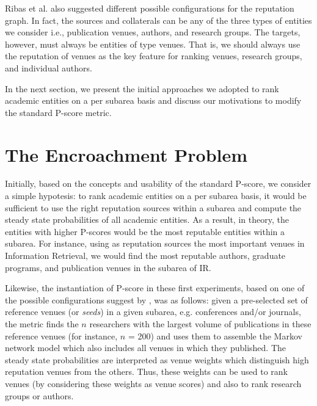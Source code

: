 \documentclass[msc]{ppgccufmg}
\begin{document}
Ribas et al. also suggested different possible configurations for the reputation graph. In fact, the sources and collaterals can be any of the three types of entities we consider i.e., publication venues, authors, and research groups. The targets, however, must always be entities of type venues. That is, we should always use the reputation of venues as the key feature for ranking venues, research groups, and individual authors. 

In the next section, we present the initial approaches we adopted to rank academic entities on a per subarea basis and discuss our motivations to modify the standard P-score metric.


\section{The Encroachment Problem}\label{sec:encroachment}

Initially, based on the concepts and usability of the standard P-score, we consider a simple hypotesis: to rank academic entities on a per subarea basis, it would be sufficient to use the right reputation sources within a subarea and compute the steady state probabilities of all academic entities. As a result, in theory, the entities with higher P-scores would be the most reputable entities within a subarea. For instance, using as reputation sources the most important venues in Information Retrieval, we would find the most reputable authors, graduate programs, and publication venues in the subarea of IR.

Likewise, the instantiation of P-score in these first experiments, based on one of the possible configurations suggest by \citeauthor{ribas2015random}, was as follows: given a pre-selected set of reference venues (or \textit{seeds}) in a given subarea, e.g. conferences and/or journals, the metric finds the $n$ researchers with the largest volume of publications in these reference venues (for instance, $n$ = 200) and uses them to assemble the Markov network model which also includes all venues in which they published. The steady state probabilities are interpreted as venue weights which distinguish high reputation venues from the others. Thus, these weights can be used to rank venues (by considering these weights as venue scores) and also to rank research groups or authors.

\end{document}
